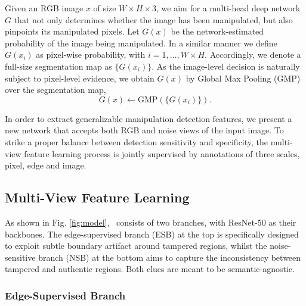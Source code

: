 

Given an RGB image $x$ of size $W\times H \times 3$, we aim for a multi-head deep network $G$ that not only determines whether the image has been manipulated, but also pinpoints its manipulated pixels. Let $G(x)$ be the network-estimated probability of the image being manipulated. In a similar manner we define $G(x_{i})$ as pixel-wise probability, with $i=1,\ldots,W \times H$. Accordingly, we denote a full-size segmentation map as $\{G(x_{i})\}$. As the image-level decision is naturally subject to pixel-level evidence, we obtain $G(x)$ by Global Max Pooling (GMP) over the segmentation map, \ie 
\begin{equation} \label{eq:gmp}
G(x) \leftarrow \mbox{GMP}\left(\{G(x_{i})\}\right).
\end{equation}








In order to extract generalizable manipulation detection features, we present a new network that accepts both RGB and noise views of the input image. To strike a proper balance between detection sensitivity and specificity, the multi-view feature learning process is jointly supervised by annotations of three scales, \ie pixel, edge and image. 





\subsection{Multi-View Feature Learning} \label{ssec:mvfl}

As shown in Fig. \ref{fig:model},  \model~consists of two branches, with ResNet-50 as their backbones. The edge-supervised branch (ESB) at the top is specifically designed to exploit subtle boundary artifact around tampered regions, whilst the noise-sensitive branch (NSB) at the bottom aims to capture the inconsistency between tampered and authentic regions. Both clues are meant to be semantic-agnostic. 
\subsubsection{Edge-Supervised Branch }\label{sssec:esb}


